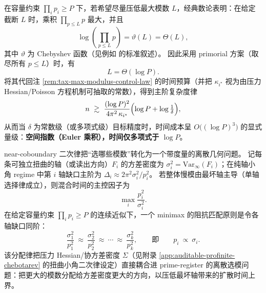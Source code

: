 \begin{remark}\label{rem:tax-primorial-polylog-time}
在容量约束 \(\prod_i p_i\ge P\) 下，若希望尽量压低最大模数 \(L\)，经典数论表明：在给定截断 \(L\) 时，乘积 \(\prod_{p\le L}p\) 最大，并且
$$
\log\!\left(\prod_{p\le L}p\right)=\vartheta(L)=\Theta(L),
$$
其中 \(\vartheta\) 为 Chebyshev 函数（见例如 \cite{Apostol1976} 的标准叙述）。
因此采用 primorial 方案（取尽所有 \(p\le L\)）时，有
$$
L=\Theta(\log P).
$$
将其代回注 \ref{rem:tax-max-modulus-control-law} 的时间预算（并把 \(\kappa_{i^\star}\) 视为由压力 Hessian/Poisson 方程机制可抽取的常数），得到主阶复杂度律
$$
n\ \gtrsim\ \frac{(\log P)^2}{4\pi^2\,\kappa_{i^\star}}\Bigl(\log P+\log\tfrac{1}{\delta}\Bigr),
$$
从而当 \(\delta\) 为常数级（或多项式级）目标精度时，时间成本呈 \(O\big((\log P)^3\big)\) 的显式量级：\textbf{空间指数（Euler 乘积），时间仅多项式于 \(\log P\)}。
\end{remark}

\begin{remark}\label{rem:tax-variance-matched-moduli}
near-coboundary 二次律把“选哪些模数”转化为一个带度量的离散几何问题。
记每条可独立扭曲的轴（或读出方向）\(F_i\) 的方差密度为 \(\sigma_i^2=\mathrm{Var}_\infty(F_i)\)；在纯轴小角 regime 中第 \(i\) 轴缺口主阶为 \(\Delta_i\approx 2\pi^2\sigma_i^2/p_i^2\)。
若整体慢模由最坏轴主导（单轴选择律成立），则混合时间的主控因子为
$$
\max_i\frac{p_i^2}{\sigma_i^2}.
$$
在给定容量约束 \(\prod_i p_i\ge P\) 的连续近似下，一个 minimax 的阻抗匹配原则是令各轴缺口同阶：
$$
\frac{\sigma_1^2}{p_1^2}\ \approx\ \frac{\sigma_2^2}{p_2^2}\ \approx\ \cdots\ \approx\ \frac{\sigma_k^2}{p_k^2},
\qquad\text{即}\qquad
p_i\ \propto\ \sigma_i.
$$
该分配律把压力 Hessian/协方差密度 \(\Sigma\)（见附录 \ref{app:auditable-profinite-chebotarev} 的扭曲小角二次律设定）直接耦合进 prime-register 的离散选模问题：把更大的模数分配给方差密度更大的方向，以压低最坏轴带来的扩散时间上界。
\end{remark}


